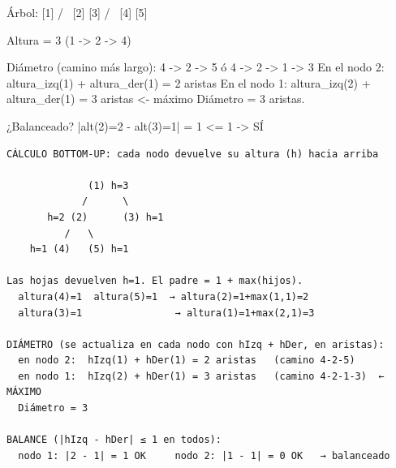\begin{dsadiagrama}
Árbol:
          [1]
        /     \
      [2]     [3]
     /   \
   [4]   [5]

Altura = 3 (1 -> 2 -> 4)

Diámetro (camino más largo): 4 -> 2 -> 5    ó   4 -> 2 -> 1 -> 3
  En el nodo 2: altura_izq(1) + altura_der(1) = 2 aristas
  En el nodo 1: altura_izq(2) + altura_der(1) = 3 aristas  <- máximo
Diámetro = 3 aristas.

¿Balanceado? |alt(2)=2 - alt(3)=1| = 1 <= 1  -> SÍ
\end{dsadiagrama}

\begin{dsacomofunciona}
\begin{verbatim}
CÁLCULO BOTTOM-UP: cada nodo devuelve su altura (h) hacia arriba

              (1) h=3
             /      \
       h=2 (2)      (3) h=1
          /   \
    h=1 (4)   (5) h=1

Las hojas devuelven h=1. El padre = 1 + max(hijos).
  altura(4)=1  altura(5)=1  → altura(2)=1+max(1,1)=2
  altura(3)=1                → altura(1)=1+max(2,1)=3

DIÁMETRO (se actualiza en cada nodo con hIzq + hDer, en aristas):
  en nodo 2:  hIzq(1) + hDer(1) = 2 aristas   (camino 4-2-5)
  en nodo 1:  hIzq(2) + hDer(1) = 3 aristas   (camino 4-2-1-3)  ← MÁXIMO
  Diámetro = 3

BALANCE (|hIzq - hDer| ≤ 1 en todos):
  nodo 1: |2 - 1| = 1 OK     nodo 2: |1 - 1| = 0 OK   → balanceado
\end{verbatim}
\end{dsacomofunciona}

